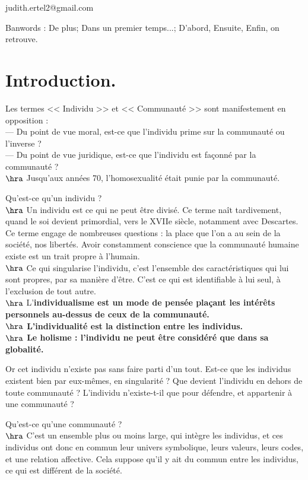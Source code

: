 \documentclass[11pt]{article}
\begin{document}


\thispagestyle{fancy}

\begin{center}
    judith.ertel2@gmail.com
\end{center}

Banwords : De plus; Dans un premier temps...; D'abord, Ensuite, Enfin, on retrouve.

\section{Introduction.}

Les termes << Individu >> et << Communauté >> sont manifestement en opposition :\\
--- Du point de vue moral, est-ce que l'individu prime sur la communauté ou l'inverse ?\\
--- Du point de vue juridique, est-ce que l'individu est façonné par la communauté ?\\
$\hra$ Jusqu'aux années 70, l'homosexualité était punie par la communauté.

Qu'est-ce qu'un individu ?\\
$\hra$ Un individu est ce qui ne peut être divisé. Ce terme naît tardivement, quand le soi devient primordial, vers le XVIIe siècle, notamment avec Descartes. Ce terme engage de nombreuses questions : la place que l'on a au sein de la société, nos libertés. Avoir constamment conscience que la communauté humaine existe est un trait propre à l'humain.\\
$\hra$ Ce qui singularise l'individu, c'est l'ensemble des caractéristiques qui lui sont propres, par sa manière d'être. C'est ce qui est identifiable à lui seul, à l'exclusion de tout autre.\\
$\hra$ L'\bf{individualisme} est un mode de pensée plaçant les intérêts personnels au-dessus de ceux de la communauté.\\
$\hra$ L'\bf{individualité} est la distinction entre les individus.\\
$\hra$ Le \bf{holisme} : l'individu ne peut être considéré que dans sa globalité.

Or cet individu n'existe pas sans faire parti d'un tout. Est-ce que les individus existent bien par eux-mêmes, en singularité ? Que devient l'individu en dehors de toute communauté ? L'individu n'existe-t-il que pour défendre, et appartenir à une communauté ?

Qu'est-ce qu'une communauté ?\\
$\hra$ C'est un ensemble plus ou moins large, qui intègre les individus, et ces individus ont donc en commun leur univers symbolique, leurs valeurs, leurs codes, et une relation affective. Cela suppose qu'il y ait du commun entre les individus, ce qui est différent de la société. 
\end{document}
